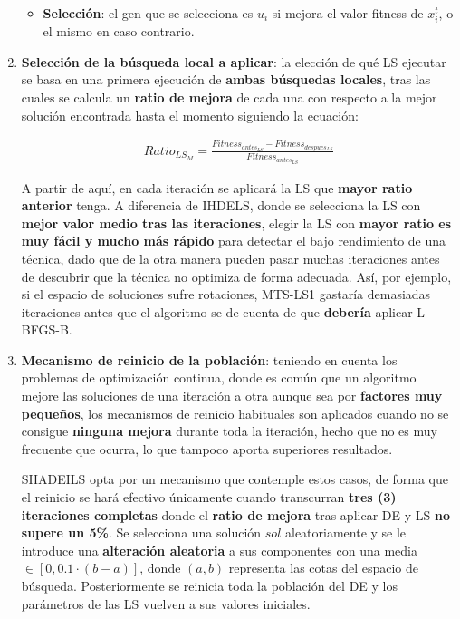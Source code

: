 \begin{enumerate}
\begin{itemize}
		\item \textbf{Selección}: el gen que se selecciona es $u_i$ si mejora el valor fitness de $x_i^t$, o el mismo en caso contrario.
	\end{itemize}

	\item \label{algoSHADEILS:2}\textbf{Selección de la búsqueda local a aplicar}: la elección de qué LS ejecutar se basa en una primera ejecución de \textbf{ambas búsquedas locales}, tras las cuales se calcula un \textbf{ratio de mejora} de cada una con respecto a la mejor solución encontrada hasta el momento siguiendo la ecuación:
	
	 \begin{equation}\label{eq:LS-Seleccion}
	 	\begin{gathered}
			Ratio_{LS_M} = \frac{Fitness_{antes_{LS}} - Fitness_{despues_{LS}}}{Fitness_{antes_{LS}}}
		 \end{gathered}
	 \end{equation}
	 
	 A partir de aquí, en cada iteración se aplicará la LS que \textbf{mayor ratio anterior} tenga. A diferencia de IHDELS, donde se selecciona la LS con \textbf{mejor valor medio tras las iteraciones}, elegir la LS con \textbf{mayor ratio es muy fácil y mucho más rápido} para detectar el bajo rendimiento de una técnica, dado que de la otra manera pueden pasar muchas iteraciones antes de descubrir que la técnica no optimiza de forma adecuada. Así, por ejemplo, si el espacio de soluciones sufre rotaciones, MTS-LS1 gastaría demasiadas iteraciones antes que el algoritmo se de cuenta de que \textbf{debería} aplicar L-BFGS-B.
	 
	 \item \label{algSHADEILS:3} \textbf{Mecanismo de reinicio de la población}: teniendo en cuenta los problemas de optimización continua, donde es común que un algoritmo mejore las soluciones de una iteración a otra aunque sea por \textbf{factores muy pequeños}, los mecanismos de reinicio habituales son aplicados cuando no se consigue \textbf{ninguna mejora} durante toda la iteración, hecho que no es muy frecuente que ocurra, lo que tampoco aporta superiores resultados.
	 
	 SHADEILS opta por un mecanismo que contemple estos casos, de forma que el reinicio se hará efectivo únicamente cuando transcurran \textbf{tres (3) iteraciones completas} donde el \textbf{ratio de mejora} tras aplicar DE y LS \textbf{no supere un 5\%}. Se selecciona una solución $sol$ aleatoriamente y se le introduce una \textbf{alteración aleatoria} a sus componentes con una media $\in [0, 0.1\cdot (b-a)]$, donde $(a,b)$ representa las cotas del espacio de búsqueda. Posteriormente se reinicia toda la población del DE y los parámetros de las LS vuelven a sus valores iniciales.
	
\end{enumerate}

